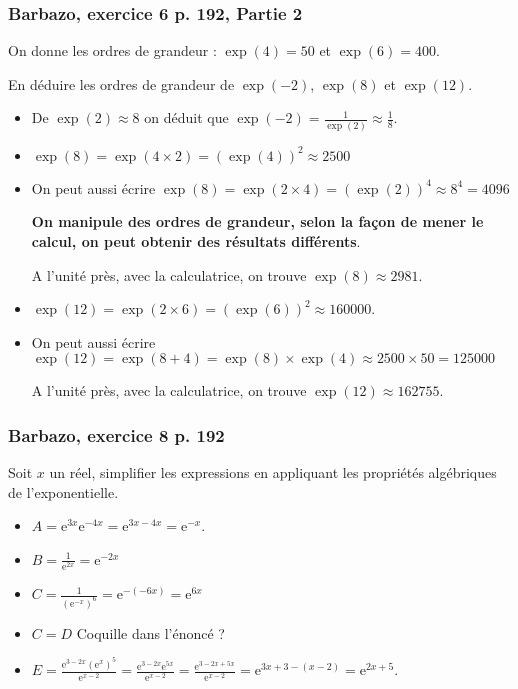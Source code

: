 \documentclass[11pt, hyperref={urlcolor=red,%
            linkcolor=blue, %
            colorlinks=true}]{beamer}
\begin{document}
\begin{frame}
\frametitle{Barbazo, exercice 6 p. 192, Partie 2}

On donne les ordres de grandeur : $\exp(4)=50$ et $\exp(6)=400$.

En déduire les ordres de grandeur de  $\exp(-2)$, $\exp(8)$ et $\exp(12)$.

\begin{itemize}
	\item De $\exp(2) \approx 8$ on déduit que $\exp(-2)=\frac{1}{\exp(2)}\approx \frac{1}{8}$. 
	\item $\exp(8)= \exp(4 \times 2)=\left(\exp(4)\right)^{2}\approx 2500$
	
	
	\item On peut aussi écrire $\exp(8) = \exp(2 \times 4)=\left(\exp(2)\right)^{4}\approx 8^4 = 4096$
	
	\textbf{On manipule des ordres de grandeur, selon la façon de mener le calcul, on peut obtenir des résultats différents}.

A l'unité près, avec la calculatrice, on trouve $\exp(8) \approx 2981$.


	\item $\exp(12)=\exp(2 \times 6)=\left(\exp(6)\right)^{2}\approx 160000$.

	\item On peut aussi écrire $\exp(12) = \exp(8 + 4)=\exp(8) \times \exp(4) \approx 2500 \times 50 = 125000$


A l'unité près, avec la calculatrice, on trouve $\exp(12) \approx 162755$.
\end{itemize}
\end{frame}



\begin{frame}
\frametitle{Barbazo, exercice 8 p. 192}
\label{exo8}

Soit $x$ un réel, simplifier les expressions en appliquant les propriétés algébriques de l'exponentielle.

\begin{itemize}
	\item $A=\text{e}^{3x}\text{e}^{-4x}=\text{e}^{3x-4x}=\text{e}^{-x}$. 
	\item $B=\frac{1}{\text{e}^{2x}}=\text{e}^{-2x}$
	\item $C=\frac{1}{\left(\text{e}^{-x}\right)^{6}}=\text{e}^{-(-6x)}=\text{e}^{6x}$
	\item $C=D$ Coquille dans l'énoncé ?
	\item $E=\frac{\text{e}^{3-2x} \left(\text{e}^{x}\right)^{5}}{\text{e}^{x-2}}=\frac{\text{e}^{3-2x} \text{e}^{5x}}{\text{e}^{x-2}}=\frac{\text{e}^{3-2x+5x}}{\text{e}^{x-2}}=\text{e}^{3x+3-(x-2)}=\text{e}^{2x+5}$.
\end{itemize}
\end{frame}
\end{document}
